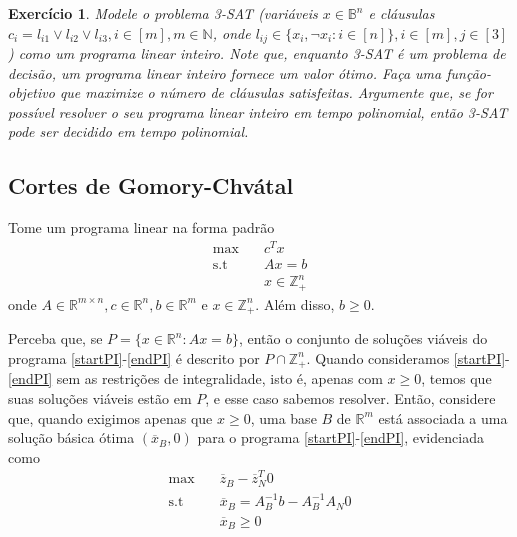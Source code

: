 \documentclass[]{article}
\newtheorem{exercicio}{Exercício}
\numberwithin{equation}{section}
\begin{document}
\begin{exercicio}
  Modele o problema 3-SAT (variáveis $x \in \mathbb{B}^n$ e cláusulas
  $c_i = l_{i1} \vee l_{i2} \vee l_{i3}, i \in [m], m \in \mathbb{N}$, onde
  $l_{ij} \in \{x_i, \neg x_i : i \in [n]\}, i \in [m], j \in [3]$) como um programa linear inteiro.
  Note que, enquanto 3-SAT é um problema de decisão, um programa linear inteiro fornece um valor ótimo.
  Faça uma função-objetivo que maximize o número de cláusulas satisfeitas.
  Argumente que, se for possível resolver o seu programa linear inteiro em tempo polinomial, então 3-SAT
  pode ser decidido em tempo polinomial.
\end{exercicio}

\subsection{Cortes de Gomory-Chvátal}

Tome um programa linear na forma padrão
\begin{align}
\max        &\quad  c^Tx  \label{startPI} \\
\text{s.t}  &\quad  Ax = b                \\
            &\quad  x \in \mathbb{Z}_+^n  \label{endPI}
\end{align}
onde $A \in \mathbb{R}^{m \times n}, c \in \mathbb{R}^n, b \in \mathbb{R}^m$ e $x \in \mathbb{Z}_+^n$.
Além disso, $b \geq 0$.

Perceba que, se $P = \{x \in \mathbb{R}^n : Ax = b\}$, então o conjunto de soluções viáveis do programa
\eqref{startPI}-\eqref{endPI} é descrito por $P \cap \mathbb{Z}_+^n$.
Quando consideramos \eqref{startPI}-\eqref{endPI} sem as restrições de integralidade, isto é, apenas
com $x \geq 0$, temos que suas soluções viáveis estão em $P$, e esse caso sabemos resolver.
Então, considere que, quando exigimos apenas que $x \geq 0$, uma base $B$ de $\mathbb{R}^m$ está
associada a uma solução básica ótima $(\overline{x}_B, 0)$ para o programa
\eqref{startPI}-\eqref{endPI}, evidenciada como
\begin{align}
\max        &\quad  \overline{z}_B - \overline{z}_N^T0  \label{startOptimal}  \\
\text{s.t}  &\quad  \overline{x}_B = A_B^{-1}b - A_B^{-1}A_N0                 \\
            &\quad  \overline{x}_B \geq 0 \label{endOptimal}
\end{align}
\end{document}
